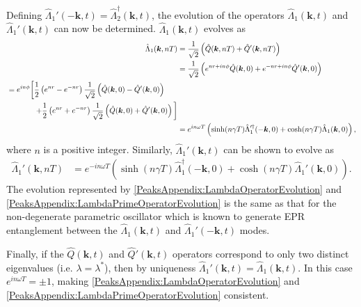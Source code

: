 Defining $\hat{\Lambda}_1'(-\bm{k}, t) = \hat{\Lambda}_2^\dagger(\bm{k}, t)$, the evolution of the operators $\hat{\Lambda}_1(\bm{k}, t)$ and $\hat{\Lambda}_1'(\bm{k}, t)$ can now be determined. $\hat{\Lambda}_1(\bm{k}, t)$ evolves as
\begin{align}
    \hat{\Lambda}_1(\bm{k}, nT) &= \frac{1}{\sqrt{2}} \left(\hat{Q}(\bm{k}, nT) + \hat{Q}'(\bm{k}, nT) \right) \\
        &= \frac{1}{\sqrt{2}} \left( e^{nr + i n\phi} \hat{Q}(\bm{k}, 0) + e^{-nr + i n \phi}\hat{Q}'(\bm{k}, 0)\right) \\
        \begin{split}
            &=  e^{i n \phi} \bigg[ \frac{1}{2}\left( e^{nr} - e^{-nr}\right)\frac{1}{\sqrt{2}}\left(\hat{Q}(\bm{k}, 0) - \hat{Q}'(\bm{k}, 0) \right) \\
            &\relphantom{=e^{i n \phi}\bigg[} + \frac{1}{2} \left( e^{nr} + e^{-nr}\right)\frac{1}{\sqrt{2}} \left( \hat{Q}(\bm{k}, 0) + \hat{Q}'(\bm{k}, 0)\right)\bigg]
        \end{split}\\
        &= e^{i n \omega T} \left( \sinh(n\gamma T) \hat{\Lambda}_1'^\dagger(-\bm{k}, 0) + \cosh(n \gamma T) \hat{\Lambda}_1(\bm{k}, 0)\right), \label{PeaksAppendix:LambdaOperatorEvolution}
\end{align}
where $n$ is a positive integer. Similarly, $\hat{\Lambda}_1'(\bm{k}, t)$ can be shown to evolve as
\begin{align}
    \hat{\Lambda}_1'(\bm{k}, nT) &= e^{-i n \omega T} \left( \sinh(n \gamma T) \hat{\Lambda}_1^\dagger(-\bm{k}, 0) + \cosh(n \gamma T) \hat{\Lambda}_1'(\bm{k}, 0)\right). \label{PeaksAppendix:LambdaPrimeOperatorEvolution}
\end{align}
The evolution represented by \eqref{PeaksAppendix:LambdaOperatorEvolution} and \eqref{PeaksAppendix:LambdaPrimeOperatorEvolution} is the same as that for the non-degenerate parametric oscillator \citep{WallsMilburn} which is known to generate EPR entanglement between the $\hat{\Lambda}_1(\bm{k}, t)$ and $\hat{\Lambda}_1'(-\bm{k}, t)$ modes.

Finally, if the $\hat{Q}(\bm{k}, t)$ and $\hat{Q}'(\bm{k}, t)$ operators correspond to only two distinct eigenvalues (i.e. $\lambda = \lambda^*$), then by uniqueness $\hat{\Lambda}_1'(\bm{k}, t) = \hat{\Lambda}_1(\bm{k}, t)$. In this case $\displaystyle e^{i n\omega T} = \pm 1$, making \eqref{PeaksAppendix:LambdaOperatorEvolution} and \eqref{PeaksAppendix:LambdaPrimeOperatorEvolution} consistent.

